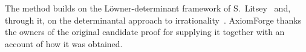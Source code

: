 
The method builds on the L\"owner-determinant framework of S.~Litsey~\cite{Litsey2026Lowner} and,
through it, on the determinantal approach to irrationality~\cite{Zudilin2017}. AxiomForge thanks
the owners of the original candidate proof for supplying it together with an account of how it was
obtained.
